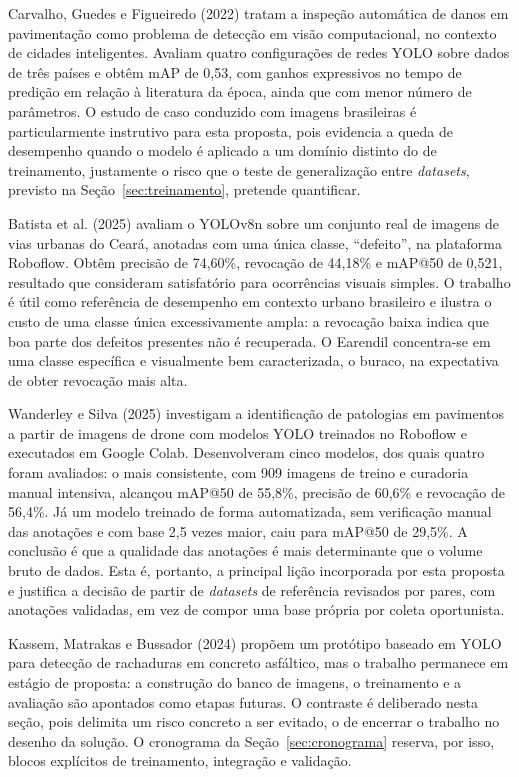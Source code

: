 \documentclass[12pt]{article}
\begin{document}
Carvalho, Guedes e Figueiredo (2022) tratam a inspeção automática de
danos em pavimentação como problema de detecção em visão computacional,
no contexto de cidades inteligentes. Avaliam quatro configurações de
redes YOLO sobre dados de três países e obtêm mAP de 0,53, com ganhos
expressivos no tempo de predição em relação à literatura da época, ainda
que com menor número de parâmetros. O estudo de caso conduzido com
imagens brasileiras é particularmente instrutivo para esta proposta, pois
evidencia a queda de desempenho quando o modelo é aplicado a um domínio
distinto do de treinamento, justamente o risco que o teste de
generalização entre \emph{datasets}, previsto na
Seção~\ref{sec:treinamento}, pretende quantificar.

Batista et al. (2025) avaliam o YOLOv8n sobre um conjunto real de imagens
de vias urbanas do Ceará, anotadas com uma única classe, ``defeito'', na
plataforma Roboflow. Obtêm precisão de 74,60\%, revocação de 44,18\% e
mAP@50 de 0,521, resultado que consideram satisfatório para ocorrências
visuais simples. O trabalho é útil como referência de desempenho em
contexto urbano brasileiro e ilustra o custo de uma classe única
excessivamente ampla: a revocação baixa indica que boa parte dos defeitos
presentes não é recuperada. O Earendil concentra-se em uma classe
específica e visualmente bem caracterizada, o buraco, na expectativa de
obter revocação mais alta.

Wanderley e Silva (2025) investigam a identificação de patologias em
pavimentos a partir de imagens de drone com modelos YOLO treinados no
Roboflow e executados em Google Colab. Desenvolveram cinco modelos, dos
quais quatro foram avaliados: o mais consistente, com 909 imagens de
treino e curadoria manual intensiva, alcançou mAP@50 de 55,8\%, precisão
de 60,6\% e revocação de 56,4\%. Já um modelo treinado de forma
automatizada, sem verificação manual das anotações e com base 2,5 vezes
maior, caiu para mAP@50 de 29,5\%. A conclusão é que a qualidade das
anotações é mais determinante que o volume bruto de dados. Esta é, portanto, a
principal lição incorporada por esta proposta e justifica a decisão de
partir de \emph{datasets} de referência revisados por pares, com
anotações validadas, em vez de compor uma base própria por coleta
oportunista.

Kassem, Matrakas e Bussador (2024) propõem um protótipo baseado em YOLO
para detecção de rachaduras em concreto asfáltico, mas o trabalho
permanece em estágio de proposta: a construção do banco de imagens, o
treinamento e a avaliação são apontados como etapas futuras. O contraste
é deliberado nesta seção, pois delimita um risco concreto a ser evitado,
o de encerrar o trabalho no desenho da solução. O cronograma da
Seção~\ref{sec:cronograma} reserva, por isso, blocos explícitos de
treinamento, integração e validação.
\end{document}
